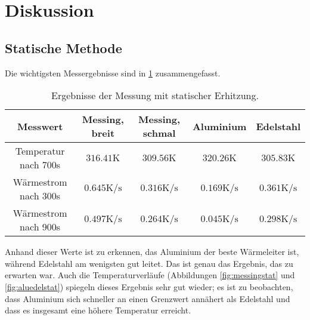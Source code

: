 \section{Diskussion}
\label{sec:Diskussion}

\subsection{Statische Methode}
Die wichtigsten Messergebnisse sind in \ref{tab:pieceofshit} zusammengefasst.

\begin{table}
    \centering
    \caption{Ergebnisse der Messung mit statischer Erhitzung.}
    \label{tab:pieceofshit}
    \begin{tabular}{c c c c c}
        \toprule
        Messwert & Messing, breit & Messing, schmal & Aluminium & Edelstahl \\
        \midrule
        Temperatur nach 700s & $316.41 \si{\kelvin}$  & $309.56 \si{\kelvin} $ & $320.26 \si{\kelvin}$ & $305.83 \si{\kelvin}$\\
        Wärmestrom nach 300s & $0.645 \si{\kelvin\per\s}$ & $0.316 \si{\kelvin\per\s}$ & $0.169 \si{\kelvin\per\s}$ & $0.361 \si{\kelvin\per\s}$\\
        Wärmestrom nach 900s & $0.497 \si{\kelvin\per\s}$ & $0.264 \si{\kelvin\per\s}$ & $0.045 \si{\kelvin\per\s}$ & $0.298 \si{\kelvin\per\s}$\\
        \bottomrule
    \end{tabular}
\end{table}%

\noindent Anhand dieser Werte ist zu erkennen, das Aluminium der beste Wärmeleiter ist, während Edelstahl am wenigsten gut leitet. Das ist genau das Ergebnis, das zu erwarten war.
Auch die Temperaturverläufe (Abbildungen \ref{fig:messingstat} und \ref{fig:aluedelstat}) 
spiegeln dieses Ergebnis sehr gut wieder; es ist zu beobachten, dass Aluminium sich schneller an einen Grenzwert annähert als Edelstahl und dass es 
insgesamt eine höhere Temperatur erreicht. 

